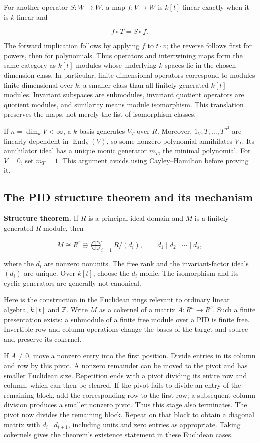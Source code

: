 \documentclass[
  11pt,
]{article}
\begin{document}
For another operator \(S:W\to W\), a map \(f:V\to W\) is \(k[t]\)-linear
exactly when it is \(k\)-linear and

\[f\circ T=S\circ f.\]

The forward implication follows by applying \(f\) to \(t\cdot v\); the
reverse follows first for powers, then for polynomials. Thus operators
and intertwining maps form the same category as \(k[t]\)-modules whose
underlying \(k\)-spaces lie in the chosen dimension class. In
particular, finite-dimensional operators correspond to modules
finite-dimensional over \(k\), a smaller class than all finitely
generated \(k[t]\)-modules. Invariant subspaces are submodules,
invariant quotient operators are quotient modules, and similarity means
module isomorphism. This translation preserves the maps, not merely the
list of isomorphism classes.

If \(n=\dim_k V<\infty\), a \(k\)-basis generates \(V_T\) over \(R\).
Moreover, \(1_V,T,\ldots,T^{n^2}\) are linearly dependent in
\(\operatorname{End}_k(V)\), so some nonzero polynomial annihilates
\(V_T\). Its annihilator ideal has a unique monic generator \(m_T\), the
minimal polynomial. For \(V=0\), set \(m_T=1\). This argument avoids
using Cayley--Hamilton before proving it.

\subsection{The PID structure theorem and its
mechanism}\label{the-pid-structure-theorem-and-its-mechanism}

\textbf{Structure theorem.} If \(R\) is a principal ideal domain and
\(M\) is a finitely generated \(R\)-module, then

\[M\cong R^r\oplus\bigoplus_{i=1}^s R/(d_i),
\qquad d_1\mid d_2\mid\cdots\mid d_s,\]

where the \(d_i\) are nonzero nonunits. The free rank and the
invariant-factor ideals \((d_i)\) are unique. Over \(k[t]\), choose the
\(d_i\) monic. The isomorphism and its cyclic generators are generally
not canonical.

Here is the construction in the Euclidean rings relevant to ordinary
linear algebra, \(k[t]\) and \(\mathbb Z\). Write \(M\) as a cokernel of
a matrix \(A:R^a\to R^b\). Such a finite presentation exists: a
submodule of a finite free module over a PID is finite free. Invertible
row and column operations change the bases of the target and source and
preserve its cokernel.

If \(A\ne0\), move a nonzero entry into the first position. Divide
entries in its column and row by this pivot. A nonzero remainder can be
moved to the pivot and has smaller Euclidean size. Repetition ends with
a pivot dividing its entire row and column, which can then be cleared.
If the pivot fails to divide an entry of the remaining block, add the
corresponding row to the first row; a subsequent column division
produces a smaller nonzero pivot. Thus this stage also terminates. The
pivot now divides the remaining block. Repeat on that block to obtain a
diagonal matrix with \(d_i\mid d_{i+1}\), including units and zero
entries as appropriate. Taking cokernels gives the theorem's existence
statement in these Euclidean cases.
\end{document}
